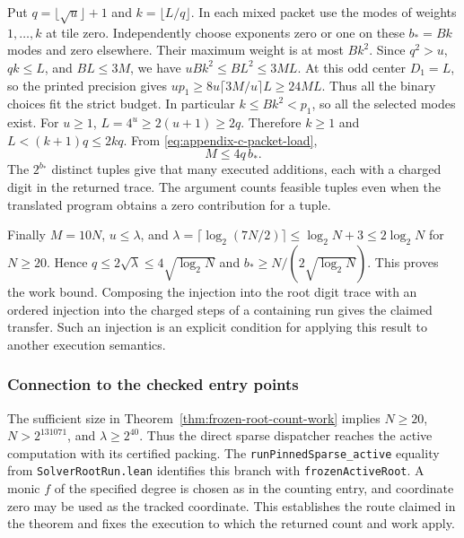 \documentclass[
  11pt,
]{article}
\newcommand{\floor}[1]{\lfloor #1\rfloor}
\newcommand{\ceil}[1]{\lceil #1\rceil}
\begin{document}
Put \(q=\floor{\sqrt{u}}+1\) and \(k=\floor{L/q}\).
In each mixed packet use the modes of weights \(1,\ldots,k\)
at tile zero. Independently choose exponents zero or one on
these \(b_*=Bk\) modes and zero elsewhere. Their maximum weight
is at most \(Bk^2\).
Since \(q^2>u\), \(qk\le L\), and \(BL\le3M\), we have
\(uBk^2\le BL^2\le3ML\). At this odd center \(D_1=L\), so the
printed precision gives \(up_1\ge8u\ceil{3M/u}L\ge24ML\).
Thus all the binary choices fit the strict budget. In particular
\(k\le Bk^2<p_1\), so all the selected modes exist. For \(u\ge1\),
\(L=4^u\ge2(u+1)\ge2q\). Therefore \(k\ge1\) and
\(L<(k+1)q\le2kq\). From \eqref{eq:appendix-c-packet-load},
\[
                M\le4q\,b_*.
\]
The \(2^{b_*}\) distinct tuples give that many executed additions,
each with a charged digit in the returned trace. The argument
counts feasible tuples even when the translated program obtains
a zero contribution for a tuple.

Finally \(M=10N\), \(u\le\lambda\), and
\(\lambda=\ceil{\log_2(7N/2)}\le\log_2N+3\le2\log_2 N\)
for \(N\ge20\). Hence \(q\le 2\sqrt{\lambda}\le4\sqrt{\log_2 N}\)
and \(b_*\ge N/(2\sqrt{\log_2 N})\). This proves the work
bound. Composing the injection into the root digit trace
with an ordered injection into the charged steps of a containing
run gives the claimed transfer. Such an injection is an explicit
condition for applying this result to another execution semantics.

\subsubsection*{Connection to the checked entry points}

The sufficient size in Theorem~\ref{thm:frozen-root-count-work}
implies \(N\ge20\), \(N>2^{131071}\), and
\(\lambda\ge2^{40}\). Thus the direct sparse dispatcher reaches
the active computation with its certified packing. The
\texttt{runPinnedSparse\_active} equality from
\texttt{SolverRootRun.lean} identifies this branch with
\texttt{frozenActiveRoot}. A monic \(f\) of the specified degree
is chosen as in the counting entry, and coordinate zero may
be used as the tracked coordinate. This establishes the
route claimed in the theorem and fixes the execution to which
the returned count and work apply.
\end{document}
